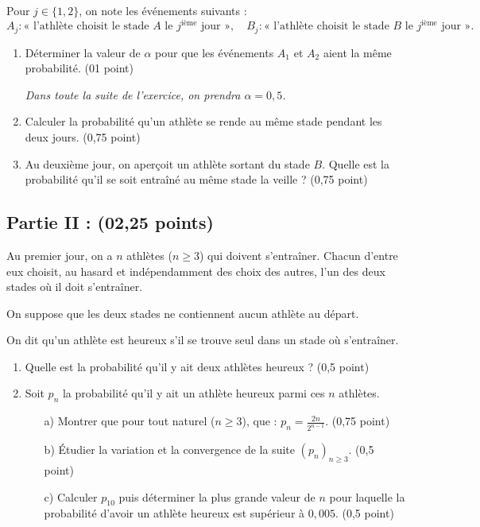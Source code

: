 \documentclass[11pt]{article}
\begin{document}
\noindent
Pour \( j \in \{1,2\} \), on note les événements suivants :
\[
A_j : \text{« l’athlète choisit le stade } A \text{ le } j^\text{ième} \text{ jour »}, \quad
B_j : \text{« l’athlète choisit le stade } B \text{ le } j^\text{ième} \text{ jour »}.
\]

\begin{enumerate}
    \item Déterminer la valeur de \( \alpha \) pour que les événements \( A_1 \) et \( A_2 \) aient la même probabilité. \hfill (01 point)

    \noindent \textit{Dans toute la suite de l’exercice, on prendra \( \alpha = 0{,}5 \).}

    \item Calculer la probabilité qu’un athlète se rende au même stade pendant les deux jours. \hfill (0,75 point)

    \item Au deuxième jour, on aperçoit un athlète sortant du stade \( B \). Quelle est la probabilité qu’il se soit entraîné au même stade la veille ? \hfill (0,75 point)
\end{enumerate}

\vspace{0.4cm}
\noindent
\subsection*{Partie II :  (02,25 points)}

\vspace{0.2cm}
\noindent
Au premier jour, on a \( n \) athlètes (\( n \geq 3 \)) qui doivent s’entraîner. Chacun d’entre eux choisit, au hasard et indépendamment des choix des autres, l’un des deux stades où il doit s’entraîner.

\noindent
On suppose que les deux stades ne contiennent aucun athlète au départ.

\noindent
On dit qu’un athlète est heureux s’il se trouve seul dans un stade où s’entraîner.

\begin{enumerate}
    \item Quelle est la probabilité qu’il y ait deux athlètes heureux ? \hfill (0,5 point)

    \item Soit \( p_n \) la probabilité qu’il y ait un athlète heureux parmi ces \( n \) athlètes.
    \begin{enumerate}
        \item[a)] Montrer que pour tout naturel (\( n \geq 3 \)), que : \( p_n = \frac{2n}{2^{n-1}} \). \hfill (0,75 point)
        \item[b)] Étudier la variation et la convergence de la suite \( (p_n)_{n \geq 3} \). \hfill (0,5 point)
        \item[c)] Calculer \( p_{10} \) puis déterminer la plus grande valeur de \( n \) pour laquelle la probabilité d’avoir un athlète heureux est supérieur à \( 0,005 \). \hfill (0,5 point)
    \end{enumerate}
\end{enumerate}
\end{document}
